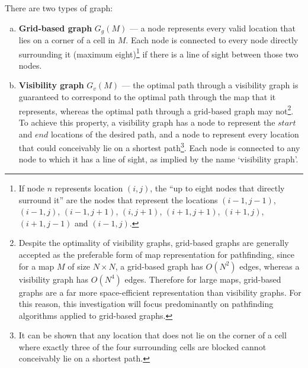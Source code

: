 \documentclass[12pt,notitlepage]{report}
\begin{document}
\noindent
There are two types of graph:
\begin{enumerate}[(a)]
\item{\bfseries Grid-based graph} $G_{g}(M)$ --- a node represents every valid location that lies on a corner of a cell in $M$. Each node is connected to every node directly surrounding it (maximum eight)\footnote{If node $n$ represents location $(i,j)$, the ``up to eight nodes that directly surround it'' are the nodes that represent the locations $(i-1,j-1)$, $(i-1,j)$, $(i-1,j+1)$, $(i,j+1)$, $(i+1,j+1)$, $(i+1,j)$, $(i+1,j-1)$ and $(i-1,j)$.} if there is a line of sight between those two nodes.\\

\item{\bfseries Visibility graph} $G_{v}(M)$ --- the optimal path through a visibility graph is guaranteed to correspond to the optimal path through the map that it represents, whereas the optimal path through a grid-based graph may not\footnote{Despite the optimality of visibility graphs, grid-based graphs are generally accepted as the preferable form of map representation for pathfinding, since for a map $M$ of size $N \times N$, a grid-based graph has {$O(N^{2})$} edges, whereas a visibility graph has {$O(N^{4})$} edges. Therefore for large maps, grid-based graphs are a far more space-efficient representation than visibility graphs. For this reason, this investigation will focus predominantly on pathfinding algorithms applied to grid-based graphs.}\cite{Nash12}. To achieve this property, a visibility graph has a node to represent the $start$ and $end$ locations of the desired path, and a node to represent every location that could conceivably lie on a shortest path\footnote{It can be shown\cite{Nash12} that any location that does not lie on the corner of a cell where exactly three of the four surrounding cells are blocked cannot conceivably lie on a shortest path.}. Each node is connected to any node to which it has a line of sight, as implied by the name `visibility graph'.\\

\end{enumerate}
\end{document}

